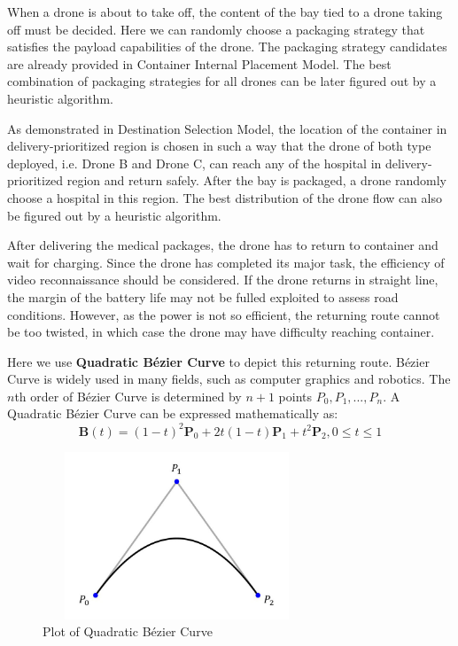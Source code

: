 \documentclass{mcmthesis}
\begin{document}
When a drone is about to take off, the content of the bay tied to a drone taking off must be decided. Here we can randomly choose a packaging strategy that satisfies the payload capabilities of the drone. The packaging strategy candidates are already provided in Container Internal Placement Model. The best combination of packaging strategies for all drones can be later figured out by a heuristic algorithm.

As demonstrated in Destination Selection Model, the location of the container in delivery-prioritized region is chosen in such a way that the drone of both type deployed, i.e. Drone B and Drone C, can reach any of the hospital in delivery-prioritized region and return safely. After the bay is packaged, a drone randomly choose a hospital in this region. The best distribution of the drone flow can also be figured out by a heuristic algorithm.

After delivering the medical packages, the drone has to return to container and wait for charging. Since the drone has completed its major task, the efficiency of video reconnaissance should be considered. If the drone returns in straight line, the margin of the battery life may not be fulled exploited to assess road conditions. However, as the power is not so efficient, the returning route cannot be too twisted, in which case the drone may have difficulty reaching container. 

Here we use \textbf{Quadratic B\'{e}zier Curve} \cite{BezierCurve} to depict this returning route. B\'{e}zier Curve is widely used in many fields, such as computer graphics and robotics. The $n$th order of B\'{e}zier Curve is determined by $n+1$ points $P_0, P_1, ..., P_{n}$. A Quadratic B\'{e}zier Curve can be expressed mathematically as:
\begin{equation}
    \mathbf{B}(t)=(1-t)^2\mathbf{P}_0 + 2t(1-t)\mathbf{P}_1 + t^2\mathbf{P}_2, 0 \leq t \leq 1
    \label{Equ:bezr}
\end{equation}

\begin{figure}[htbp]
    \centering
    \includegraphics[width=8cm,height=5cm]{figures/bezier.jpg}
    \caption{Plot of Quadratic B\'{e}zier Curve}
    \label{Fig:bezr}
\end{figure}
\end{document}
